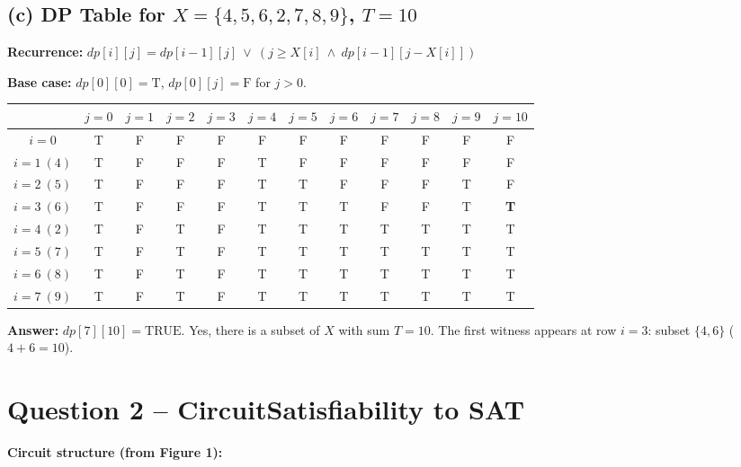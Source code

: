 \documentclass[12pt]{article}
\begin{document}
\subsection*{(c) DP Table for $X = \{4,5,6,2,7,8,9\}$, $T = 10$}

\textbf{Recurrence:}
$\mathit{dp}[i][j] = \mathit{dp}[i-1][j]\ \lor\ (j \ge X[i]\ \land\ \mathit{dp}[i-1][j-X[i]])$

\textbf{Base case:} $\mathit{dp}[0][0] = \mathrm{T}$,
$\mathit{dp}[0][j] = \mathrm{F}$ for $j > 0$.

\medskip
\begin{center}
\begin{tabular}{|c|c|c|c|c|c|c|c|c|c|c|c|}
\hline
        & $j{=}0$ & $j{=}1$ & $j{=}2$ & $j{=}3$ & $j{=}4$ & $j{=}5$ & $j{=}6$ & $j{=}7$ & $j{=}8$ & $j{=}9$ & $j{=}10$ \\
\hline
$i{=}0$      & T & F & F & F & F & F & F & F & F & F & F  \\
$i{=}1\ (4)$ & T & F & F & F & T & F & F & F & F & F & F  \\
$i{=}2\ (5)$ & T & F & F & F & T & T & F & F & F & T & F  \\
$i{=}3\ (6)$ & T & F & F & F & T & T & T & F & F & T & \textbf{T}  \\
$i{=}4\ (2)$ & T & F & T & F & T & T & T & T & T & T & T  \\
$i{=}5\ (7)$ & T & F & T & F & T & T & T & T & T & T & T  \\
$i{=}6\ (8)$ & T & F & T & F & T & T & T & T & T & T & T  \\
$i{=}7\ (9)$ & T & F & T & F & T & T & T & T & T & T & T  \\
\hline
\end{tabular}
\end{center}

\textbf{Answer:} $\mathit{dp}[7][10] = \mathrm{TRUE}$.  Yes, there is a
subset of $X$ with sum $T = 10$.  The first witness appears at row $i{=}3$:
subset $\{4, 6\}$ ($4 + 6 = 10$).

\section*{Question 2 -- CircuitSatisfiability to SAT}

\textbf{Circuit structure (from Figure 1):}
\end{document}
